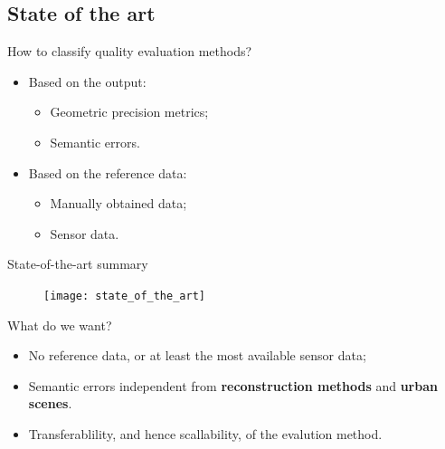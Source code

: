 \documentclass[export]{beamer}
\begin{document}
        \subsection{State of the art}
            \begin{frame}{How to classify quality evaluation methods?}
                \begin{itemize}[
                        label=$\blacktriangleright$,
                        font=\color{IGNGreen},
                        itemsep=2em
                    ]
                    \item<1-> Based on the output:
                    \begin{itemize}[label=--, itemsep=1em]
                        \item<2-> Geometric precision metrics;
                        \item<2-> Semantic errors.
                    \end{itemize}
                    \item<3-> Based on the reference data:
                    \begin{itemize}[label=--, itemsep=1em]
                        \item<4-> Manually obtained data;
                        \item<4-> Sensor data.
                    \end{itemize}
                \end{itemize}
            \end{frame}
            \begin{frame}[plain]{State-of-the-art summary}
                \begin{figure}
                    \texttt{[image: state\_of\_the\_art]}
                \end{figure}
            \end{frame}
            \begin{frame}{What do we want?}
                \begin{itemize}[label=$\blacktriangleright$, font=\color{IGNGreen}, itemsep=2em]
                    \item<1-> No reference data, or at least the most available sensor data;
                    \item<2-> Semantic errors independent from \textbf{reconstruction methods} and \textbf{urban scenes}.
                    \item<3-> Transferablility, and hence scallability, of the evalution method.
                \end{itemize}
            \end{frame}
\end{document}
